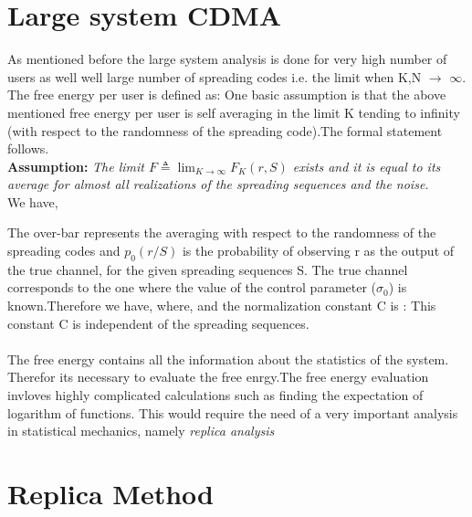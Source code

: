 \documentclass[letterpaper,english,10pt]{article}
\begin{document}
\section{Large system CDMA}
As mentioned before the large system analysis is done for very high number of users as well well large number of spreading codes i.e. the limit when K,N $\rightarrow$ $\infty$. The free energy per user is defined as:
One basic assumption is that the above mentioned free energy per user is self averaging in the limit K tending to infinity (with respect to the randomness of the spreading code).The formal statement follows.\\
 
\textbf{Assumption: } \textit{The limit $F \triangleq \lim_{K \to \infty} F_K(r,S)$ exists and it is equal to its average for almost all realizations of the spreading sequences and the noise.}\\
We have,\\
 
The over-bar represents the averaging with respect to the randomness of the spreading codes and $p_0(r/S)$ is the probability of observing r as the output of the true channel, for the given spreading sequences S. The true channel corresponds to the one where the value of the control parameter ($\sigma_0$) is known.Therefore we have,
where,
and the normalization constant C is :
This constant C is independent of the spreading sequences.\\\\

The free energy contains all the information about the statistics of the system. Therefor its necessary to evaluate the free enrgy.The free energy evaluation invloves highly complicated calculations such as finding the expectation of logarithm of functions. This would require the need of a very important analysis in statistical mechanics, namely \textit{replica analysis}  



\section{Replica Method}
\end{document}
